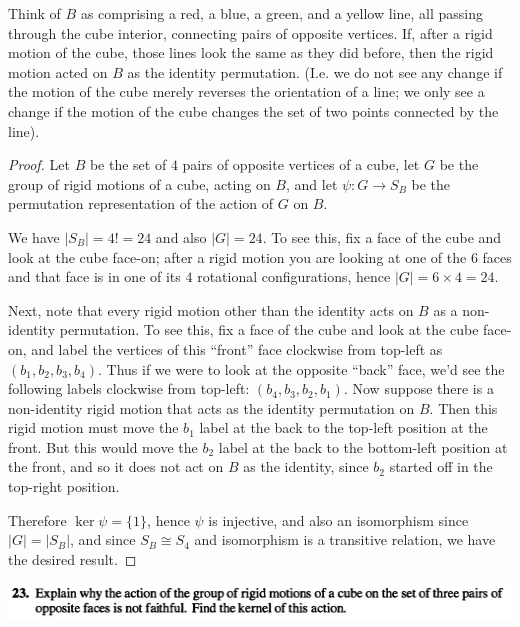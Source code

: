 \begin{intuition*}
  Think of $B$ as comprising a red, a blue, a green, and a yellow line, all passing through the
  cube interior, connecting pairs of opposite vertices. If, after a rigid motion of the cube, those
  lines look the same as they did before, then the rigid motion acted on $B$ as the identity
  permutation. (I.e. we do not see any change if the motion of the cube merely reverses the
  orientation of a line; we only see a change if the motion of the cube changes the set of two
  points connected by the line).
\end{intuition*}

\begin{proof}
  Let $B$ be the set of $4$ pairs of opposite vertices of a cube, let $G$ be the group of rigid
  motions of a cube, acting on $B$, and let $\psi: G \to S_B$ be the permutation representation of the
  action of $G$ on $B$.

  We have $|S_B| = 4! = 24$ and also $|G| = 24$. To see this, fix a face of the cube and look at
  the cube face-on; after a rigid motion you are looking at one of the $6$ faces and that face is
  in one of its $4$ rotational configurations, hence $|G| = 6 \times 4 = 24$.

  Next, note that every rigid motion other than the identity acts on $B$ as a non-identity
  permutation. To see this, fix a face of the cube and look at the cube face-on, and label the
  vertices of this ``front​'' face clockwise from top-left as $(b_1, b_2, b_3, b_4)$. Thus if we
  were to look at the opposite ``back​'' face, we'd see the following labels clockwise from
  top-left: $(b_4,b_3,b_2,b_1)$. Now suppose there is a non-identity rigid motion that acts as the
  identity permutation on $B$. Then this rigid motion must move the $b_1$ label at the back to the
  top-left position at the front. But this would move the $b_2$ label at the back to the
  bottom-left position at the front, and so it does not act on $B$ as the identity, since $b_2$
  started off in the top-right position.

  Therefore $\ker \psi = \{1\}$, hence $\psi$ is injective, and also an isomorphism since
  $|G| = |S_B|$, and since $S_B \cong S_4$ and isomorphism is a transitive relation, we have the
  desired result.
\end{proof}



\begin{mdframed}
\includegraphics[width=400pt]{img/abstract-algebra--nf--4-5a92.png}
\end{mdframed}

